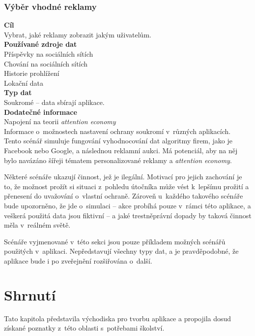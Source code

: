 \subsubsection*{Výběr vhodné reklamy} 
\textbf{Cíl}\\
Vybrat, jaké reklamy zobrazit jakým uživatelům.\\
\textbf{Používané zdroje dat}\\
Příspěvky na sociálních sítích\\
Chování na sociálních sítích\\
Historie prohlížení\\
Lokační data\\
\textbf{Typ dat}\\
Soukromé -- data sbírají aplikace.\\
\textbf{Dodatečné informace}\\
Napojení na teorii \textit{attention economy}\\
Informace o~možnostech nastavení ochrany soukromí v~různých aplikacích.\\

Tento scénář simuluje fungování vyhodnocování dat algoritmy firem, jako je Facebook nebo Google, a následnou reklamní aukci. Má potenciál, aby na něj bylo navázáno šířeji tématem personalizované reklamy a \textit{attention economy}. 


Některé scénáře ukazují činnost, jež je ilegální. Motivací pro jejich zachování je to, že  možnost prožít si situaci z~pohledu útočníka může vést k~lepšímu prožití a přenesení do uvažování o~vlastní ochraně. Zároveň u~každého takového scénáře bude upozorněno, že jde o~simulaci -- akce probíhá pouze v~rámci této aplikace, a veškerá použitá data jsou fiktivní -- a jaké trestněprávní dopady by taková činnost měla v~reálném světě.

Scénáře vyjmenované v~této sekci jsou pouze příkladem možných scénářů použitých v~aplikaci. Nepředstavují všechny typy dat, a je pravděpodobné, že aplikace bude i po zveřejnění rozšiřována o~další.


\section*{Shrnutí}
Tato kapitola představila východiska pro tvorbu aplikace a propojila dosud získané poznatky z~této oblasti s~potřebami školství.  